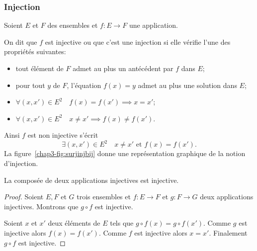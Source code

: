 \subsubsection{Injection}
\label{chap3-subsubsec:injection}
Soient $E$ et $F$ des ensembles et $f: E \longrightarrow F$ une application.
\begin{defdef}
  On dit que $f$ est injective ou que c'est une injection si elle vérifie l'une des propriétés suivantes:
  \begin{itemize}
  \item tout élément de $F$ admet au plus un antécédent par $f$ dans $E$;
  \item pour tout $y$ de $F$, l'équation $f(x)=y$ admet au plus une solution dans $E$;
  \item $\forall (x,x') \in E^2 \quad f(x)=f(x') \implies x=x'$;
  \item $\forall (x,x') \in E^2 \quad  x \neq x' \implies f(x) \neq f(x')$.
  \end{itemize}
  Ainsi $f$ est non injective s'écrit
  \begin{equation}
    \exists (x,x') \in E^2 \quad x \neq x' \text{~et~} f(x) = f(x').
  \end{equation}
  La figure~\ref{chap3-fig:surjinjbij} donne une représentation graphique de la notion d'injection.
\end{defdef}
\begin{theo}
  La composée de deux applications injectives est injective.
\end{theo}
\begin{proof}
  Soient $E,F$ et $G$ trois ensembles et $f:E \longrightarrow F$ et $g: F \longrightarrow G$ deux applications injectives. Montrons que $g \circ f$ est injective. 

Soient $x$ et $x'$ deux éléments de $E$ tels que $g \circ f(x) = g \circ f(x')$. Comme $g$ est injective alors $f(x)=f(x')$. Comme $f$ est injective alors $x=x'$. Finalement $g \circ f$ est injective.
\end{proof}

